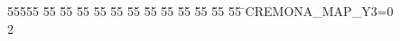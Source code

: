 %
%
\begin{tabbing}
55555 \= 55 \= 55 \= 55 \= 55 \= 55 \= 55 \= 55 \= 55 \= 55 \= 55 \= 55 \= 55 \= \>CREMONA\_MAP\_Y3=0\\[0pt]
2\>\end{tabbing}
